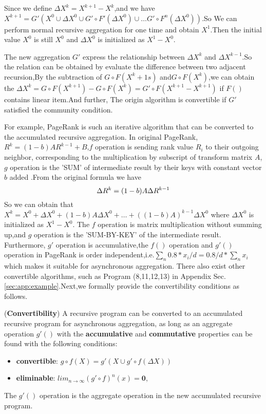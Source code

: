 Since we define $\Delta X^k=X^{k+1}-X^{k}$,and we have $X^{k+1}=G'(X^0\cup \Delta X^0 \cup G'\circ F'(\Delta X^0)\cup \ldots G' \circ F^n(\Delta X^0))$.So We can perform normal recursive aggregation for one time and obtain $X^1$.Then the initial value $X^0$ is still $X^0$ and $\Delta X^0$ is initialized as $X^1-X^0$.

The new aggregation $G'$ express the relationship between $\Delta X^k$ and $\Delta X^{k-1}$.So the relation can be obtained by evaluate the difference between two adjacent recursion,By the subtraction of $G\circ F(X^k+1s)$ and$G\circ F(X^{k})$,we can obtain the $\Delta X^{k}=G\circ F(X^{k+1})-G\circ F(X^{k})=G'\circ F(X^{k+1}-X^{k+1})$ if $F()$contains linear item.And further, The origin algorithm is convertible if $G'$ satisfied the community condition.

For example, PageRank is such an iterative algorithm that can be converted to the accumulated recursive aggregation. %
In original PageRank,$R^k=(1-b)AR^{k-1}+B$,$f$ operation is sending rank value $R_i$ to their outgoing neighbor, corresponding to the multiplication by subscript of transform matrix $A$,$g$ operation is the 'SUM' of intermediate result by their keys with constant vector $b$ added .From the original formula we have
\begin{equation}
\Delta R^k=(1-b)A\Delta R^{k-1}\notag
\end{equation}
So we can obtain that $X^k=X^0+\Delta X^0+(1-b)A\Delta X^0+\ldots+((1-b)A)^{k-1}\Delta X^0$
where $\Delta X^0$ is initialized as $X^1-X^0$. The $f$ operation is matrix multiplication without summing up,and $g$ operation is the 'SUM-BY-KEY' of the intermediate result. 
Furthermore, $g'$ operation is accumulative,the $f()$ operation and $g'()$ operation in PageRank is order independent,i.e.$\sum_{n}{0.8*x_i/d}=0.8/d*\sum_{n}{x_i}$ which makes it suitable for asynchronous aggregation. There also exist other convertible algorithms, such as Program (8,11,12,13) in Appendix Sec. \ref{sec:app:example}.Next,we formally provide the convertibility conditions as follows.

\begin{theorem}
	\label{th:convert}
	(\textbf{Convertibility}) A recursive program can be converted to an accumulated recursive program for asynchronous aggregation, as long as an aggregate operation $g'()$ with the \textbf{accumulative} and \textbf{commutative} properties can be found with the following conditions:\\
	\begin{itemize}
		\item \textbf{convertible}: $g\circ f(X)=g'(X\cup g'\circ f(\Delta X))$
\item \textbf{eliminable}: $lim_{n\rightarrow\infty}(g'\circ f)^n(x)=\textbf{0}$,
	\end{itemize}
	 The $g'()$ operation is the aggregate operation in the new accumulated recursive program.
\end{theorem}

